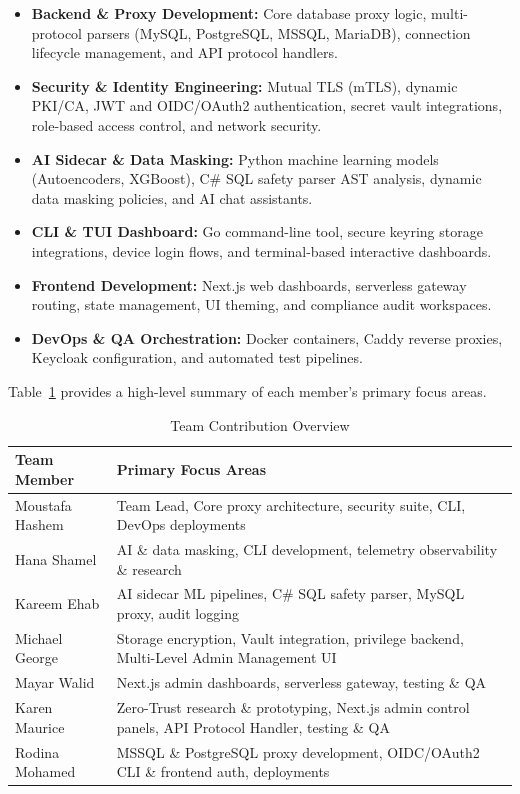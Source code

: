 \begin{itemize}
    \item \textbf{Backend \& Proxy Development:} Core database proxy logic, multi-protocol parsers (MySQL, PostgreSQL, MSSQL, MariaDB), connection lifecycle management, and API protocol handlers.
    \item \textbf{Security \& Identity Engineering:} Mutual TLS (mTLS), dynamic PKI/CA, JWT and OIDC/OAuth2 authentication, secret vault integrations, role-based access control, and network security.
    \item \textbf{AI Sidecar \& Data Masking:} Python machine learning models (Autoencoders, XGBoost), C\# SQL safety parser AST analysis, dynamic data masking policies, and AI chat assistants.
    \item \textbf{CLI \& TUI Dashboard:} Go command-line tool, secure keyring storage integrations, device login flows, and terminal-based interactive dashboards.
    \item \textbf{Frontend Development:} Next.js web dashboards, serverless gateway routing, state management, UI theming, and compliance audit workspaces.
    \item \textbf{DevOps \& QA Orchestration:} Docker containers, Caddy reverse proxies, Keycloak configuration, and automated test pipelines.
\end{itemize}

Table~\ref{tab:contribution-overview} provides a high-level summary of each member's primary focus areas.

\begin{table}[H]
\centering
\caption{Team Contribution Overview}
\label{tab:contribution-overview}
\begin{tabularx}{\textwidth}{|l|X|}
\hline
\textbf{Team Member} & \textbf{Primary Focus Areas} \\
\hline
Moustafa Hashem & Team Lead, Core proxy architecture, security suite, CLI, DevOps deployments \\
\hline
Hana Shamel & AI \& data masking, CLI development, telemetry observability \& research \\
\hline
Kareem Ehab & AI sidecar ML pipelines, C\# SQL safety parser, MySQL proxy, audit logging \\
\hline
Michael George & Storage encryption, Vault integration, privilege backend, Multi-Level Admin Management UI \\
\hline
Mayar Walid & Next.js admin dashboards, serverless gateway, testing \& QA \\
\hline
Karen Maurice & Zero-Trust research \& prototyping, Next.js admin control panels, API Protocol Handler, testing \& QA \\
\hline
Rodina Mohamed & MSSQL \& PostgreSQL proxy development, OIDC/OAuth2 CLI \& frontend auth, deployments \\
\hline
\end{tabularx}
\end{table}

